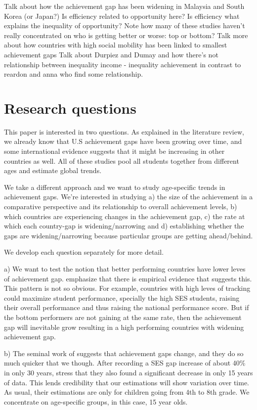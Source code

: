 \documentclass[11pt, a4paper]{article}\usepackage[]{graphicx}\usepackage[]{color}
\begin{document}
Talk about how the achievement gap has been widening in Malaysia and South Korea (or Japan?)
Is efficiency related to opportunity here? Is efficiency what explains the inequality of opportunity?
Note how many of these studies haven't really concentrated on who is getting better or worse: top or bottom?
Talk more about how countries with high social mobility has been linked to smallest achievement gaps
Talk about Durpiez and Dumay and how there's not relationship between inequality income - inequality achievement in contrast to reardon and anna who find some relationship.

\section{Research questions}

This paper is interested in two questions. As explained in the literature review, we already know that U.S achievement gaps have been growing over time, and some international evidence suggests that it might be increasing in other countries as well. All of these studies pool all students together from different ages and estimate global trends.

We take a different approach and we want to study age-specific trends in achievement gaps. We're interested in studying a) the size of the achievement in a comparative perspective and its relationship to overall achievement levels, b) which countries are experiencing changes in the achievement gap, c) the rate at which each country-gap is widening/narrowing and d) establishing whether the gaps are widening/narrowing because particular groups are getting ahead/behind.

We develop each question separately for more detail.


a) We want to test the notion that better performing countries have lower leves of achievement gap. \citep{werfhorst_mijs} emphasize that there is empirical evidence that suggests this. This pattern is not so obvious. For example, countries with high leves of tracking could maximize student performance, specially the high SES students, raising their overall performance and thus raising the national performance score. But if the bottom performers are not gaining at the same rate, then the achievement gap will inevitable grow resulting in a high performing countries with widening achievement gap.

b) The seminal work of \citet{reardon2011} suggests that achievement gaps change, and they do so much quicker that we though. After recording a SES gap increase of about 40\% in only 30 years, \citep{reardon_portilla} stress that they also found a significant decrease in only 15 years of data. This lends credibility that our estimations will show variation over time. As usual, their estimations are only for children going from 4th to 8th grade. We concentrate on age-specific groups, in this case, 15 year olds.
\end{document}
